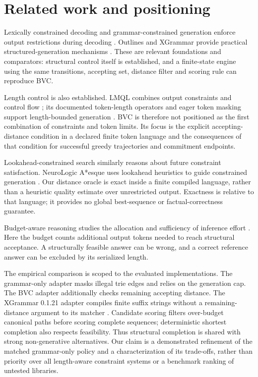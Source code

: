 \documentclass[12pt,a4paper]{article}
\begin{document}
\section{Related work and positioning}\label{sec:related}
Lexically constrained decoding and grammar-constrained generation enforce output restrictions during decoding \citep{hokamp2017,geng2023}. Outlines and XGrammar provide practical structured-generation mechanisms \citep{willard2023,dong2024}. These are relevant foundations and comparators: structural control itself is established, and a finite-state engine using the same transitions, accepting set, distance filter and scoring rule can reproduce BVC.

Length control is also established. LMQL combines output constraints and control flow \citep{beurer2023}; its documented token-length operators and eager token masking support length-bounded generation \citep{lmqldocs}. BVC is therefore not positioned as the first combination of constraints and token limits. Its focus is the explicit accepting-distance condition in a declared finite token language and the consequences of that condition for successful greedy trajectories and commitment endpoints.

Lookahead-constrained search similarly reasons about future constraint satisfaction. NeuroLogic A*esque uses lookahead heuristics to guide constrained generation \citep{lu2022}. Our distance oracle is exact inside a finite compiled language, rather than a heuristic quality estimate over unrestricted output. Exactness is relative to that language; it provides no global best-sequence or factual-correctness guarantee.

Budget-aware reasoning studies the allocation and sufficiency of inference effort \citep{wang2024,han2025,muennighoff2025}. Here the budget counts additional output tokens needed to reach structural acceptance. A structurally feasible answer can be wrong, and a correct reference answer can be excluded by its serialized length.

The empirical comparison is scoped to the evaluated implementations. The grammar-only adapter masks illegal trie edges and relies on the generation cap. The BVC adapter additionally checks remaining accepting distance. The XGrammar 0.1.21 adapter compiles finite suffix strings without a remaining-distance argument to its matcher \citep{xgrammarcode}. Candidate scoring filters over-budget canonical paths before scoring complete sequences; deterministic shortest completion also respects feasibility. Thus structural completion is shared with strong non-generative alternatives. Our claim is a demonstrated refinement of the matched grammar-only policy and a characterization of its trade-offs, rather than priority over all length-aware constraint systems or a benchmark ranking of untested libraries.
\end{document}
